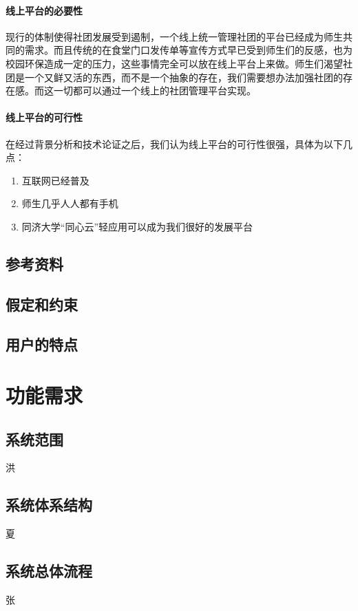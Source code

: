 \documentclass[UTF8]{ctexart}
\begin{document}
\paragraph{线上平台的必要性}
现行的体制使得社团发展受到遏制，一个线上统一管理社团的平台已经成为师生共同的需求。而且传统的在食堂门口发传单等宣传方式早已受到师生们的反感，也为校园环保造成一定的压力，这些事情完全可以放在线上平台上来做。师生们渴望社团是一个又鲜又活的东西，而不是一个抽象的存在，我们需要想办法加强社团的存在感。而这一切都可以通过一个线上的社团管理平台实现。

\paragraph{线上平台的可行性}
在经过背景分析和技术论证之后，我们认为线上平台的可行性很强，具体为以下几点：
\begin{enumerate}[1)]
\item 互联网已经普及
\item 师生几乎人人都有手机
\item 同济大学“同心云”轻应用可以成为我们很好的发展平台
\end{enumerate}

\subsection{参考资料}

\subsection{假定和约束}

\subsection{用户的特点}

\section{功能需求}
\subsection{系统范围}
洪
\subsection{系统体系结构}
夏
\subsection{系统总体流程}
张
\end{document}

